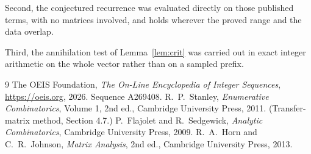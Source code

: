 \documentclass[11pt,a4paper]{article}
\theoremstyle{plain}
\theoremstyle{definition}
\begin{document}
Second, the conjectured recurrence was evaluated directly on those published terms, with no
matrices involved, and holds wherever the proved range and the data overlap.

Third, the annihilation test of Lemma~\ref{lem:crit} was carried out in exact integer
arithmetic on the whole vector rather than on a sampled prefix.

\begin{thebibliography}{9}
 The OEIS Foundation, \emph{The On-Line Encyclopedia of Integer
Sequences}, \url{https://oeis.org}, 2026. Sequence A269408.
 R.~P.~Stanley, \emph{Enumerative Combinatorics}, Volume 1, 2nd ed.,
Cambridge University Press, 2011. (Transfer-matrix method, Section 4.7.)
 P.~Flajolet and R.~Sedgewick, \emph{Analytic Combinatorics}, Cambridge
University Press, 2009.
 R.~A.~Horn and C.~R.~Johnson, \emph{Matrix Analysis}, 2nd ed., Cambridge
University Press, 2013.
\end{thebibliography}
\end{document}
